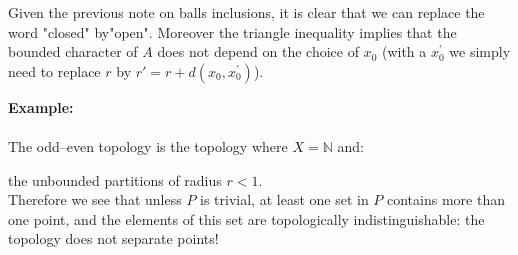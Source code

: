 	Given the previous note on balls inclusions, it is clear that we can replace the word "closed" by"open". Moreover the triangle inequality implies that the bounded character of $A$ does not depend on the choice of $x_0$ (with a $x_0^{'}$ we simply need to replace $r$ by $r'=r+d\left(x_0,x_0^{'}\right)$).
	\begin{tcolorbox}[colframe=black,colback=white,sharp corners]
	\textbf{{\Large {}}Example:}\\\\
	The odd–even topology is the topology where $X = \mathbb{N}$ and:
	
	the unbounded partitions of radius $r<1$. \\
	
	 Therefore we see that unless $P$ is trivial, at least one set in $P$ contains more than one point, and the elements of this set are topologically indistinguishable: the topology does not separate points!
	\end{tcolorbox}
	
